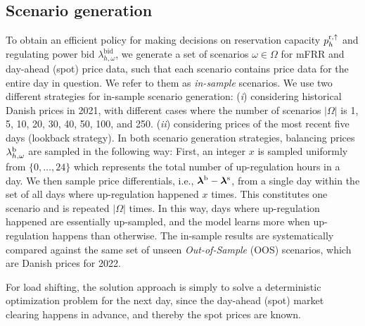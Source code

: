 \vspace{-1mm}
\subsection{Scenario generation}\label{sec:scenario_generation}
To obtain an efficient policy for making decisions on reservation capacity $p_{h}^{\rm{r},\uparrow}$ and regulating power bid $\lambda_{h,\omega}^{\text{bid}}$, we generate a set of scenarios $\omega \in \Omega$ for  mFRR and day-ahead (spot) price data, such that each scenario contains price data for the entire day in question. We refer to them as \textit{in-sample} scenarios. We use two different strategies for in-sample scenario generation: (\textit{i}) considering historical Danish prices in 2021, with different cases where the number of scenarios $|\Omega|$ is 1, 5, 10, 20, 30, 40, 50, 100, and 250. (\textit{ii}) considering prices of the most recent five days (lookback strategy). In both scenario generation strategies, balancing prices $\lambda_{h,\omega}^{\rm{b}}$ are sampled in the following way: First, an integer $x$ is sampled uniformly from $\{0, \ldots, 24\}$ which represents the total number of up-regulation hours in a day. We then sample price differentials, i.e., $\bm{\lambda}^{\rm{b}}-\bm{\lambda}^{\rm{s}}$, from a single day within the set of all days where up-regulation happened $x$ times. This constitutes one scenario and is repeated $|\Omega|$ times. In this way, days where up-regulation happened are essentially up-sampled, and the model learns more when up-regulation happens than otherwise. The in-sample results are systematically compared against the same set of unseen \textit{Out-of-Sample} (OOS) scenarios, which are Danish prices for 2022.

For load shifting, the solution approach is simply to solve a deterministic optimization problem for the next day, since the day-ahead (spot) market clearing happens in advance, and thereby the spot prices are known.

\vspace{-1mm}

